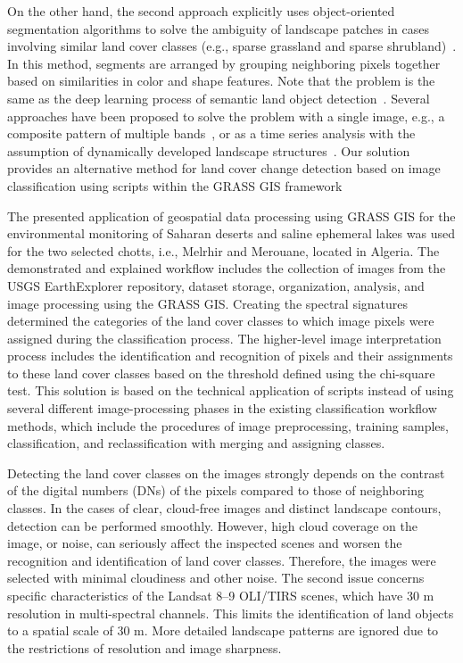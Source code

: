 \documentclass[asi,article,accept,pdftex,moreauthors]{Definitions/mdpi}
\begin{document}
{On the other hand, the second approach explicitly uses object-oriented segmentation  algorithms to solve the ambiguity of landscape patches in cases involving similar land cover classes (e.g., sparse grassland and sparse shrubland)}~\cite{Lilay}. {In this method, segments are arranged by grouping neighboring pixels together based on similarities in color and shape features. Note that the problem is the same as the deep learning process of semantic land object detection}~\cite{Yang,Kattenborn,LI2021105763}. {Several approaches have been proposed to solve the problem with a single image, e.g., a composite pattern of multiple bands}~\cite{SEYDI2023112961}, {or as a time series analysis with the assumption of dynamically developed landscape structures}~\cite{YE2023113462}. {Our solution provides an alternative method for land cover change detection based on image classification using scripts within the GRASS GIS framework}

The presented application of geospatial data processing using GRASS GIS for the environmental monitoring of Saharan deserts and saline {ephemeral }lakes was used for the two selected chotts, i.e., Melrhir and Merouane, {located }in Algeria. The demonstrated and explained workflow includes {the collection of }images from the USGS EarthExplorer repository, dataset storage, organization, analysis, and image processing using the GRASS GIS.{ Creating the }spectral signatures{ determined} the categories of the land cover classes to which image pixels were assigned during the classification process{. The }higher-level {image }interpretation process includes the identification and recognition of pixels and their assignments to these land cover classes based on the threshold defined using the chi-square test. {This solution is based on the technical application of scripts instead of using several different image-processing phases in the existing classification workflow methods, which include the procedures of image preprocessing, training samples, classification, and reclassification with merging and assigning classes.}

Detecting the land cover classes on the images strongly depends on the contrast of {the} digital numbers (DNs) {of the pixels compared to those of }neighboring {classes}. In the cases of clear, cloud-free images and distinct landscape contours, {detection} can be performed smoothly. However, {high cloud coverage on the }image,{ or }noise, can seriously affect the inspected {scenes} and worsen the recognition and identification of land cover classes. Therefore, the images were selected with minimal cloudiness and other noise. The second issue concerns specific characteristics of {the }Landsat 8--9 OLI/TIRS scenes, {which have 30 m} resolution {in multi-spectral channels. This limits the }identification of land objects to {a spatial scale} of 30 m{. } More detailed landscape patterns are ignored due to {the restrictions of }resolution and image sharpness. 
\end{document}
